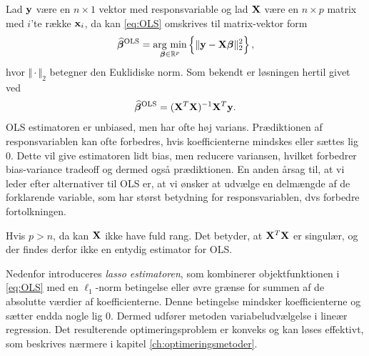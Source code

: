 Lad \(\mathbf{y}\) være en \(n \times 1\) vektor med responsvariable og lad \(\mathbf{X}\) være en $n \times p$ matrix med  \(i\)'te række $\mathbf{x}_i$, da kan \eqref{eq:OLS} omskrives til matrix-vektor form
\begin{align*}
\widehat{\tbeta}^\text{OLS} = \argmin_{ \tbeta \in \R^p} \cbr{ \Vert \y - \X \tbeta \Vert_2^2},
\end{align*}
hvor \(\Vert \cdot \Vert_2\) betegner den Euklidiske norm.
Som bekendt er løsningen hertil givet ved
\begin{align*}
\widehat{\boldsymbol{\beta}}^{\text{OLS}} = (\mathbf{X}^T \mathbf{X})^{-1} \mathbf{X}^T \mathbf{y}.
\end{align*}
OLS estimatoren er unbiased, men har ofte høj varians. 
Prædiktionen af responsvariablen kan ofte forbedres, hvis koefficienterne mindskes eller sættes lig 0.
Dette vil give estimatoren lidt bias, men reducere variansen, hvilket forbedrer bias-variance tradeoff og dermed også prædiktionen.
En anden årsag til, at vi leder efter alternativer til OLS er, at vi ønsker at udvælge en delmængde af de forklarende variable, som har størst betydning for responsvariablen, dvs forbedre fortolkningen.

Hvis \(p > n\), da kan \(\mathbf{X}\) ikke have fuld rang.
Det betyder, at $\mathbf{X}^T \mathbf{X}$ er singulær, og der findes derfor ikke en entydig estimator for OLS.

Nedenfor introduceres \textit{lasso estimatoren}, som kombinerer objektfunktionen i \eqref{eq:OLS} med en $\ell_1$-norm betingelse eller øvre grænse for summen af de absolutte værdier af koefficienterne.
Denne betingelse mindsker koefficienterne og sætter endda nogle lig 0. 
Dermed udfører metoden variabeludvælgelse i lineær regression.
Det resulterende optimeringsproblem er konveks og kan løses effektivt, som beskrives nærmere i kapitel \ref{ch:optimeringsmetoder}.
%



%